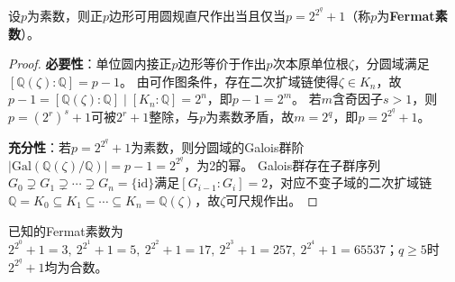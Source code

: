 \documentclass[../../main.tex]{subfiles}%
\begin{document}
\begin{example}
设$p$为素数，则正$p$边形可用圆规直尺作出当且仅当$p=2^{2^q}+1$（称$p$为\textbf{Fermat素数}）。
\end{example}

\begin{proof}

\textbf{必要性}：单位圆内接正$p$边形等价于作出$p$次本原单位根$\zeta$，分圆域满足$[\mathbb{Q}(\zeta):\mathbb{Q}]=p-1$。
由可作图条件，存在二次扩域链使得$\zeta\in K_n$，故$p-1=[\mathbb{Q}(\zeta):\mathbb{Q}]\mid[K_n:\mathbb{Q}]=2^n$，即$p-1=2^m$。
若$m$含奇因子$s>1$，则$p=(2^r)^s+1$可被$2^r+1$整除，与$p$为素数矛盾，故$m=2^q$，即$p=2^{2^q}+1$。

\textbf{充分性}：若$p=2^{2^q}+1$为素数，则分圆域的Galois群阶$|\mathrm{Gal}(\mathbb{Q}(\zeta)/\mathbb{Q})|=p-1=2^{2^q}$，为2的幂。
Galois群存在子群序列$G_0\supsetneq G_1\supsetneq\cdots\supsetneq G_n=\{\mathrm{id}\}$满足$[G_{i-1}:G_i]=2$，对应不变子域的二次扩域链$\mathbb{Q}=K_0\subseteq K_1\subseteq\cdots\subseteq K_n=\mathbb{Q}(\zeta)$，故$\zeta$可尺规作出。

\end{proof}

\begin{remark}
已知的Fermat素数为$2^{2^0}+1=3,\ 2^{2^1}+1=5,\ 2^{2^2}+1=17,\ 2^{2^3}+1=257,\ 2^{2^4}+1=65537$；$q\geqslant5$时$2^{2^q}+1$均为合数。
\end{remark}
\end{document}

